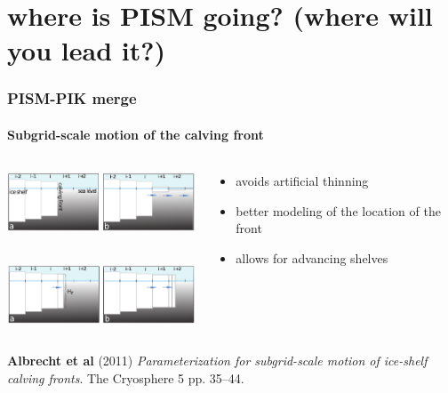 \documentclass[hide notes,intlimits]{beamer}
\begin{document}
\section[where to?]{where is PISM going?  (where will you lead it?)}


\begin{frame}
  \frametitle{PISM-PIK merge}
  \framesubtitle{Subgrid-scale motion of the calving front}
  \begin{columns}
    \begin{column}{60mm}
      \includegraphics[width=60mm]{part-grid-scheme-1.png}\\
      \rule{0pt}{5mm}\\
      \includegraphics[width=60mm]{part-grid-scheme-2.png}\\
   \end{column}
    \begin{column}{60mm}
      \begin{itemize}
      \item avoids artificial thinning
      \item better modeling of the location of the front
      \item allows for advancing shelves
      \end{itemize}
   \end{column}
  \end{columns}
   \begin{flushleft}
      \tiny \textbf{Albrecht et al} (2011)
      \emph{Parameterization for subgrid-scale motion of ice-shelf calving
        fronts}. The Cryosphere 5 pp. 35--44.
   \end{flushleft}
\end{frame}
\end{document}
